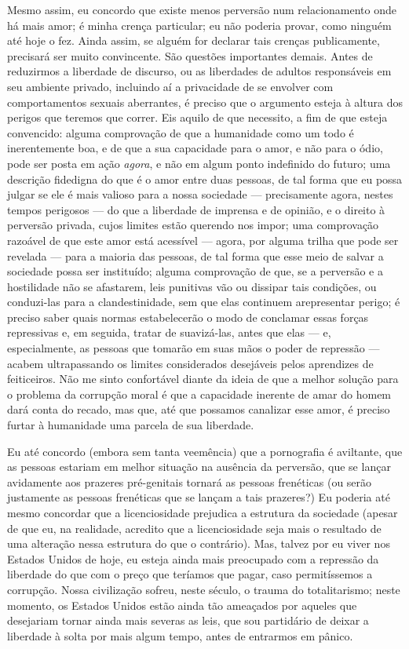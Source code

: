 Mesmo assim, eu concordo que existe menos perversão num
relacionamento onde há mais amor; é minha crença particular; eu não
poderia provar, como ninguém até hoje o fez. Ainda assim, se alguém for
declarar tais crenças publicamente, precisará ser muito convincente.
São questões importantes demais. Antes de reduzirmos a liberdade de
discurso, ou as liberdades de adultos responsáveis em seu ambiente
privado, incluindo aí a privacidade de se envolver com comportamentos
sexuais aberrantes, é preciso que o argumento esteja à altura dos
perigos que teremos que correr. Eis aquilo de que necessito, a fim de
que esteja convencido: alguma comprovação de que a humanidade como um
todo é inerentemente boa, e de que a sua capacidade para o amor, e não
para o ódio, pode ser posta em ação \textit{agora}, e não em algum
ponto indefinido do futuro; uma descrição fidedigna do que é o amor
entre duas pessoas, de tal forma que eu possa julgar se ele é mais
valioso para a nossa sociedade --- precisamente agora, nestes tempos
perigosos --- do que a liberdade de imprensa e de opinião, e o direito
à perversão privada, cujos limites estão querendo nos impor; uma
comprovação razoável de que este amor está acessível --- agora, por
alguma trilha que pode ser revelada --- para a maioria das pessoas, de
tal forma que esse meio de salvar a sociedade possa ser instituído;
alguma comprovação de que, se a perversão e a hostilidade não se
afastarem, leis punitivas vão ou dissipar tais condições, ou
conduzi-las para a clandestinidade, sem que elas continuem a\idxsexulrep[|(]
representar perigo; é preciso saber quais normas estabelecerão o modo
de conclamar essas forças repressivas e, em seguida, tratar de
suavizá-las, antes que elas --- e, especialmente, as pessoas que
tomarão em suas mãos o poder de repressão --- acabem ultrapassando os
limites considerados desejáveis pelos aprendizes de feiticeiros. Não
me sinto confortável diante da ideia de que a melhor solução para o
problema da corrupção moral é que a capacidade inerente de amar do
homem dará conta do recado, mas que, até que possamos canalizar esse
amor, é preciso furtar à humanidade uma parcela de sua liberdade.

Eu até concordo (embora sem tanta veemência) que a pornografia\idxporno{} é
aviltante, que as pessoas estariam em melhor situação na ausência da
perversão, que se lançar avidamente aos prazeres pré-genitais tornará
as pessoas frenéticas (ou serão justamente as pessoas frenéticas que se
lançam a tais prazeres?) Eu poderia até mesmo concordar que a
licenciosidade prejudica a estrutura da sociedade (apesar de que eu, na
realidade, acredito que a licenciosidade seja mais o resultado de uma
alteração nessa estrutura do que o contrário). Mas, talvez por eu viver
nos Estados Unidos de hoje, eu esteja ainda mais preocupado com a
repressão da liberdade do que com o preço que teríamos que pagar, caso
permitíssemos a corrupção. Nossa civilização sofreu, neste século, o
trauma do totalitarismo; neste momento, os Estados Unidos estão ainda
tão ameaçados por aqueles que desejariam tornar ainda mais severas as
leis, que sou partidário de deixar a liberdade à solta por mais algum
tempo, antes de entrarmos em pânico.

